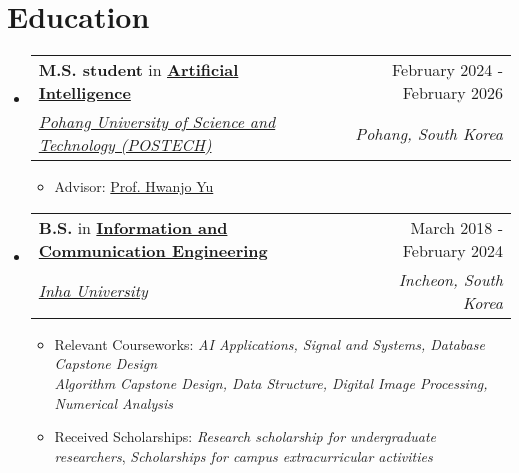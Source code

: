 \documentclass[letterpaper,11pt]{article}
\makeatletter
\newcommand{\resumeSubheading}[4]{
  \vspace{-1pt}\item
    \begin{tabular*}{0.97\textwidth}{l@{\extracolsep{\fill}}r}
      #1 & #2 \\
      \textit{\small#3} & \textit{\small #4} \\
    \end{tabular*}\vspace{-5pt}
}
\makeatother
\begin{document}
    \section{Education}
    \begin{itemize}[leftmargin=*,label=]
        \resumeSubheading
        {\textbf{M.S. student} in \textbf{\href{https://ai.postech.ac.kr/}{Artificial Intelligence}\textbf{}}}{February 2024 - February 2026}{\href{https://www.postech.ac.kr/eng/}{Pohang University of Science and Technology (POSTECH)}}{Pohang, South Korea}
            \begin{itemize}[label=\bullet]
                \item{Advisor: \href{https://sites.google.com/view/postechdi/member/faculty?authuser=0}{Prof. Hwanjo Yu}}
            \end{itemize}
            
        \resumeSubheading
        {\textbf{B.S.} in \textbf{\href{http://bit.ly/3Uu4LTi}{Information and Communication Engineering}}}{March 2018 - February 2024}{\href{https://eng.inha.ac.kr/eng/index.do}{Inha University}}{Incheon, South Korea}
            \begin{itemize}[label=\bullet]
                \item{Relevant Courseworks: \textit{AI Applications, Signal and Systems, Database Capstone Design\\Algorithm Capstone Design, Data Structure, Digital Image Processing, Numerical Analysis}}
                \item{Received Scholarships: \textit{Research scholarship for undergraduate researchers}, \textit{Scholarships for campus extracurricular activities}}
            \end{itemize}

    \end{itemize}

    
\end{document}
